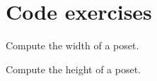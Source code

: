 \section{\usebox{\chaptergear}
  Code exercises}

\begin{codeexercise}
    Compute the width of a poset.
\end{codeexercise}

\begin{codeexercise}
    Compute the height of a poset.
\end{codeexercise}

